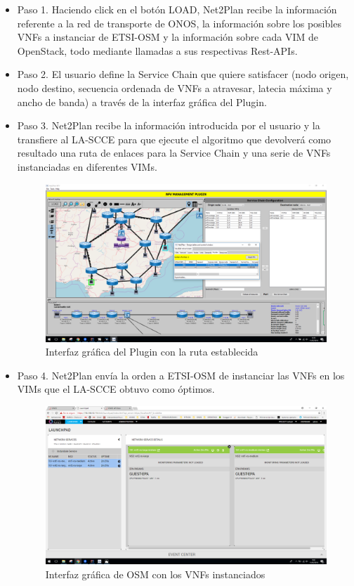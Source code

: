 \begin{itemize}
	\item Paso 1. Haciendo click en el botón LOAD, Net2Plan recibe la información referente a la red de transporte de ONOS, la información sobre los posibles VNFs a instanciar de ETSI-OSM y la información sobre cada VIM de OpenStack, todo mediante llamadas a sus respectivas Rest-APIs.
	
	\item Paso 2. El usuario define la Service Chain que quiere satisfacer (nodo origen, nodo destino, secuencia ordenada de VNFs a atravesar, latecia máxima y ancho de banda) a través de la interfaz gráfica del Plugin.
	
	\item Paso 3. Net2Plan recibe la información introducida por el usuario y la transfiere al LA-SCCE para que ejecute el algoritmo que devolverá como resultado una ruta de enlaces para la Service Chain y una serie de VNFs instanciadas en diferentes VIMs.
	
		\begin{figure}[!ht]
		\centering
		\includegraphics[width=0.7\linewidth]{imagenes/nfv_service_chain}
		\caption{Interfaz gráfica del Plugin con la ruta establecida}
		\label{fig:nfvservicechain}
	\end{figure}
	
	\item Paso 4. Net2Plan envía la orden a ETSI-OSM de instanciar las VNFs en los VIMs que el LA-SCCE obtuvo como óptimos.
	
	\begin{figure}[!ht]
		\centering
		\includegraphics[width=0.7\linewidth]{imagenes/osm_vnfs}
		\caption{Interfaz gráfica de OSM con los VNFs instanciados}
		\label{fig:osmvnfs}
	\end{figure}
	

\end{itemize}
